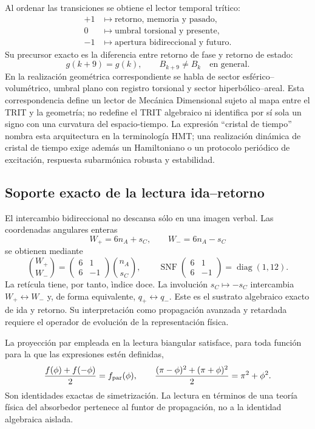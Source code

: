 Al ordenar las transiciones se obtiene el lector temporal tr\'itico:
\[
 \begin{aligned}
 +1&\longmapsto\text{retorno, memoria y pasado},\\
  0&\longmapsto\text{umbral torsional y presente},\\
 -1&\longmapsto\text{apertura bidireccional y futuro}.
 \end{aligned}
\]
Su precursor exacto es la diferencia entre retorno de fase y retorno de
estado:
\[
 g(k+9)=g(k),
 \qquad B_{k+9}\neq B_k\quad\text{en general}.
\]
En la realizaci\'on geom\'etrica correspondiente se habla de sector
esf\'erico--volum\'etrico, umbral plano con registro torsional y sector
hiperb\'olico--areal. Esta correspondencia define un lector de Mec\'anica
Dimensional sujeto al mapa entre el TRIT y la geometr\'ia; no redefine el TRIT
algebraico ni identifica por s\'i sola
un signo con una curvatura del espacio-tiempo. La expresi\'on ``cristal de
tiempo'' nombra esta arquitectura en la terminología HMT; una realizaci\'on
din\'amica de cristal de tiempo exige adem\'as un Hamiltoniano o un protocolo
peri\'odico de excitaci\'on,
respuesta subarm\'onica robusta y estabilidad.

\subsection{Soporte exacto de la lectura ida--retorno}

El intercambio bidireccional no descansa s\'olo en una imagen verbal. Las
coordenadas angulares enteras
\[
 W_+=6n_A+s_C,
 \qquad W_-=6n_A-s_C
\]
se obtienen mediante
\[
 \binom{W_+}{W_-}
 =\begin{pmatrix}6&1\\6&-1\end{pmatrix}
 \binom{n_A}{s_C},
 \qquad
 \operatorname{SNF}\!\begin{pmatrix}6&1\\6&-1\end{pmatrix}
 =\operatorname{diag}(1,12).
\]
La ret\'icula tiene, por tanto, \`indice doce. La involuci\'on
\(s_C\mapsto-s_C\) intercambia \(W_+\leftrightarrow W_-\) y, de forma
equivalente, \(q_+\leftrightarrow q_-\). Este es el sustrato algebraico exacto
de ida y retorno. Su interpretaci\'on como propagaci\'on avanzada y retardada
requiere el operador de evoluci\'on de la representaci\'on f\'isica.

La proyecci\'on par empleada en la lectura biangular satisface, para toda
funci\'on para la que las expresiones est\'en definidas,
\[
 \frac{f(\phi)+f(-\phi)}2=f_{\rm par}(\phi),
 \qquad
 \frac{(\pi-\phi)^2+(\pi+\phi)^2}{2}=\pi^2+\phi^2.
\]
Son identidades exactas de simetrizaci\'on. La lectura en t\'erminos de una
teor\'ia f\'isica del absorbedor pertenece al funtor de propagaci\'on, no a la
identidad algebraica aislada.


